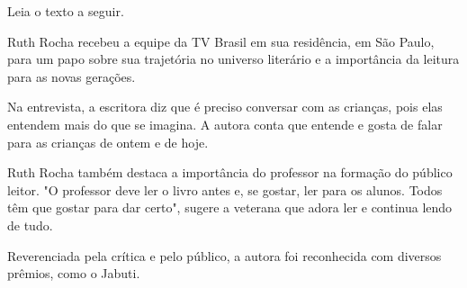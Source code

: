 

Leia o texto a seguir.

\begin{myquote}
\noindent Ruth Rocha recebeu a equipe da TV Brasil em sua residência, em São
Paulo, para um papo sobre sua trajetória no universo literário e a
importância da leitura para as novas gerações.

Na entrevista, a escritora diz que é preciso conversar com as crianças,
pois elas entendem mais do que se imagina. A autora conta que entende e
gosta de falar para as crianças de ontem e de hoje.

Ruth Rocha também destaca a importância do professor na formação do
público leitor. "O professor deve ler o livro antes e, se gostar, ler
para os alunos. Todos têm que gostar para dar certo", sugere a veterana
que adora ler e continua lendo de tudo.

Reverenciada pela crítica e pelo público, a autora foi reconhecida com
diversos prêmios, como o Jabuti.

\end{myquote}

